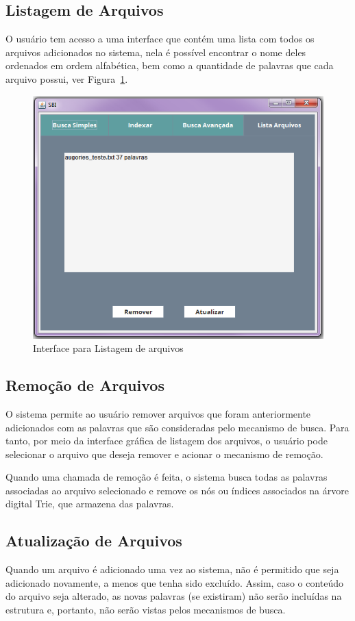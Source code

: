 \documentclass[12pt]{article}
\begin{document}
\subsection{Listagem de Arquivos}
O usuário tem acesso a uma interface que contém uma lista com todos os arquivos adicionados no sistema, nela é possível encontrar o nome deles ordenados em ordem alfabética, bem como a quantidade de palavras que cada arquivo possui, ver Figura~\ref{fig:listagemArquivos}.

\begin{figure}[!htb]
\centering
\includegraphics[width=.9\textwidth]{img/tela4-listaArquivos.png}
\caption{Interface para Listagem de arquivos}
\label{fig:listagemArquivos}
\end{figure}

\newpage

\subsection{Remoção de Arquivos}
O sistema permite ao usuário remover arquivos que foram anteriormente adicionados com as palavras que são consideradas pelo mecanismo de busca. Para tanto, por meio da interface gráfica de listagem dos arquivos, o usuário pode selecionar o arquivo que deseja remover e acionar o mecanismo de remoção.

	Quando uma chamada de remoção é feita, o sistema busca todas as palavras associadas ao arquivo selecionado e remove os nós ou índices associados na árvore digital Trie, que armazena das palavras.

\subsection{Atualização de Arquivos}
Quando um arquivo é adicionado uma vez ao sistema, não é permitido que seja adicionado novamente, a menos que tenha sido excluído. Assim, caso o conteúdo do arquivo seja alterado, as novas palavras (se existiram) não serão incluídas na estrutura e, portanto, não serão vistas pelos mecanismos de busca.
\end{document}
